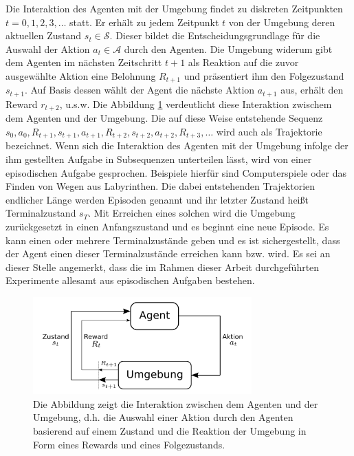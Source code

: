 Die Interaktion des Agenten mit der Umgebung findet zu diskreten Zeitpunkten $t = 0, 1, 2, 3,\dots$ statt. Er erhält zu jedem Zeitpunkt $t$ von der Umgebung deren aktuellen Zustand $s_t \in \mathcal{S}$. Dieser bildet die Entscheidungsgrundlage für die Auswahl der Aktion $a_t \in \mathcal{A}$ durch den Agenten. Die Umgebung widerum gibt dem Agenten im nächsten Zeitschritt $t+1$ als Reaktion auf die zuvor ausgewählte Aktion eine Belohnung $R_{t+1}$ und präsentiert ihm den Folgezustand $s_{t+1}$. Auf Basis dessen wählt der Agent die nächste Aktion $a_{t+1}$ aus, erhält den Reward $r_{t+2}$, u.s.w. Die Abbildung \ref{fig_schnittstelle} verdeutlicht diese Interaktion zwischem dem Agenten und der Umgebung. Die auf diese Weise entstehende Sequenz $s_0, a_0, R_{t+1}, s_{t+1}, a_{t+1}, R_{t+2}, s_{t+2}, a_{t+2}, R_{t+3},\dots$ wird auch als Trajektorie bezeichnet. Wenn sich die Interaktion des Agenten mit der Umgebung infolge der ihm gestellten Aufgabe in Subsequenzen unterteilen lässt, wird von einer episodischen Aufgabe gesprochen. Beispiele hierfür sind Computerspiele oder das Finden von Wegen aus Labyrinthen. Die dabei entstehenden Trajektorien endlicher Länge werden Episoden genannt und ihr letzter Zustand heißt Terminalzustand $s_T$. Mit Erreichen eines solchen wird die Umgebung zurückgesetzt in einen Anfangszustand und es beginnt eine neue Episode. Es kann einen oder mehrere Terminalzustände geben und es ist sichergestellt, dass der Agent einen dieser Terminalzustände erreichen kann bzw. wird. Es sei an dieser Stelle angemerkt, dass die im Rahmen dieser Arbeit durchgeführten Experimente allesamt aus episodischen Aufgaben bestehen. \\

\begin{figure}[ht!]
  \centering
  \includegraphics[keepaspectratio,width=0.75\textwidth]{abbildungen/schnittstelle_agent_umgebung.pdf}
  \caption{Die Abbildung zeigt die Interaktion zwischen dem Agenten und der Umgebung, d.h. die Auswahl einer Aktion durch den Agenten basierend auf einem Zustand und die Reaktion der Umgebung in Form eines Rewards und eines Folgezustands.}
  \label{fig_schnittstelle}
\end{figure}

